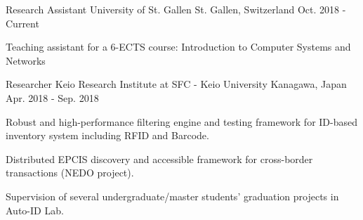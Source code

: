 

\begin{cventries}

  \cventry
    {Research Assistant} %
    {University of St. Gallen} %
    {St. Gallen, Switzerland} %
    {Oct. 2018 - Current} %
    {
      \begin{cvitems}
        \item{Teaching assistant for a 6-ECTS course: Introduction to Computer Systems and Networks}
      \end{cvitems}
    }
    
  \cventry
    {Researcher} %
    {Keio Research Institute at SFC - Keio University} %
    {Kanagawa, Japan} %
    {Apr. 2018 - Sep. 2018} %
    {
      \begin{cvitems} %
        \item{Robust and high-performance filtering engine and testing framework for ID-based inventory system including RFID and Barcode.}
        \item{Distributed EPCIS discovery and accessible framework for cross-border transactions (NEDO project).}
        \item{Supervision of several undergraduate/master students' graduation projects in Auto-ID Lab.}
      \end{cvitems}
    }


\end{cventries}
